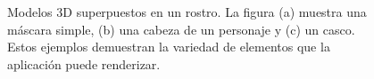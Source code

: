 \documentclass[conference]{IEEEtran}
\begin{document}
\begin{figure}[h!]
{            }\quad
            \caption{Modelos 3D superpuestos en un rostro. La figura (a) muestra una máscara simple, (b) una cabeza de un personaje y (c) un casco. Estos ejemplos demuestran la variedad de elementos que la aplicación puede renderizar.}
        \end{figure}
\end{document}
